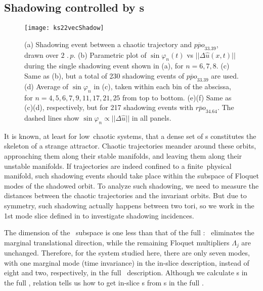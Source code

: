 \subsection{Shadowing controlled by \Fv s}

\begin{figure}[!ht]
  \centering
  \texttt{[image: ks22vecShadow]}
  \caption[Separation vector spanned by \Fv s.]{
    (a) Shadowing event between a chaotic trajectory and $\overline{ppo}_{33.39}$,
    drawn over $2\,\period{p}$.
    (b) Parametric plot of $\sin\varphi_n(t)$ vs $||\Delta\hat{u}(x,t)||$
    during the single shadowing event shown in (a), for $n=6,7,8$.
    (c) Same as (b), but a total of 230 shadowing events of $\overline{ppo}_{33.39}$ are used.
    (d) Average of $\sin\varphi_n$ in (c),
    taken within each bin of the abscissa,
    for $n=4,5,6,7,9,11,17,21,25$ from top to bottom.
    (e)(f) Same as (c)(d), respectively,
    but for 217 shadowing events with $\overline{rpo}_{34.64}$.
    The dashed lines show $\sin\varphi_n\propto||\Delta\hat{u}||$ in all panels.
  }
  \label{fig:ks22vecShadow}
\end{figure}

It is known, at least for low\dmn\ chaotic systems, that a
dense set of \po s constitutes the skeleton of a strange
attractor. Chaotic trajectories meander around these orbits,
approaching them along their stable manifolds, and leaving them along their unstable
manifolds. If
trajectories are indeed confined to a
finite\dmn\ physical manifold, such shadowing events should take
place within the subspace of {\entangled} Floquet modes of the
shadowed orbit.
To analyze such shadowing, we
need to measure the distances between the chaotic trajectories and the
invariant orbits. But due to  symmetry, such shadowing
actually happens between two tori,
so we work in the 1st mode slice  defined in
 to investigate shadowing incidences.

The dimension of the \slice\ subspace is one less than that of
the full \statesp:
\slice\ eliminates the marginal translational direction, while the
remaining Floquet multipliers $\Lambda_j$ are unchanged.
Therefore, for the system studied here, there are only seven {\entangled}
modes, with one marginal mode (time invariance) in the in-slice
description, instead of eight and two, respectively, in the full
\statesp\ description. Although we calculate \Fv s in the full \statesp,
relation  tells us how to get in-slice \Fv s
from \Fv s in the full \statesp.

